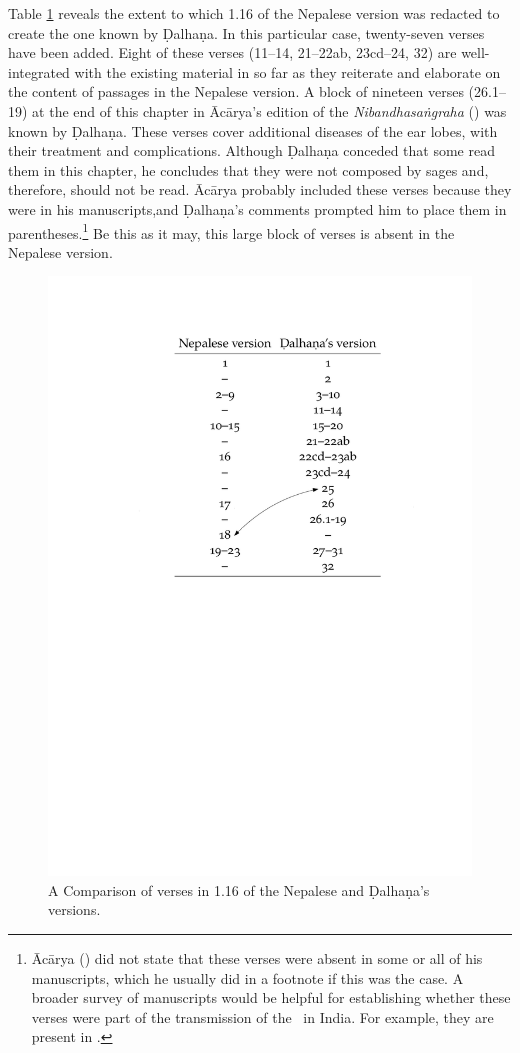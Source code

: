 Table \ref{fig:chapters} reveals the extent to which 1.16 of the Nepalese version
was redacted to create the one known by Ḍalhaṇa. In this particular case,
twenty-seven verses have been added.  Eight of these verses (11--14, 21--22ab,
23cd--24, 32) are well-integrated with the existing material in so far as they
reiterate and elaborate on the content of passages in the Nepalese version. A
block of nineteen verses (26.1--19) at the end of this chapter in Ācārya's edition
of the \emph{Nibandhasaṅgraha} (\cite[80]{vulgate}) was known by Ḍalhaṇa. These
verses cover additional diseases of the ear lobes, with their treatment and
complications. Although Ḍalhaṇa conceded that some read them in this chapter, he
concludes that they were not composed by sages and, therefore, should not be read.
Ācārya probably included these verses because they were in his manuscripts,and
Ḍalhaṇa's comments prompted him to place them in parentheses.\footnote{Ācārya
    (\cite[80]{vulgate}) did not state that these verses were absent in some or all of
    his manuscripts, which he usually did in a footnote if this was the case. A
    broader survey of manuscripts would be helpful for establishing whether these
    verses were part of the transmission of the \SS\ in India. For example, they are
    present in .}  Be this as it may, this large
    block of verses is absent in the Nepalese version.  
\begin{figure}[t]
\centering
\includegraphics[draft=false,width=.75\textwidth]{table-of-versions.pdf}
\caption{A Comparison of verses in 1.16 of the Nepalese and Ḍalhaṇa's versions.}
\label{fig:chapters}
\end{figure}

